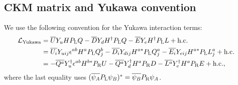 \documentclass[CheatSheet]{subfiles}
\begin{document}
\subsection{CKM matrix and Yukawa convention}\label{sec:SM-CKM}
We use the following convention for  the Yukawa interaction terms:
\begin{align}
  \mathcal L\w{Yukawa}&=
  \overline{U}\Yu H \PL Q
- \overline{D}\Yd H^\dagger \PL Q
- \overline{E}\Ye H^\dagger \PL L + \text{h.c.}\label{eq:SMyukawa}
\\&=
  \overline{U_i}\Yu[ij] \epsilon^{ab}H^a \PL Q_j^b
- \overline{D_i}\Yd[ij] H^{a*} \PL Q_j^a
- \overline{E_i}\Ye[ij] H^{a*} \PL L_j^a + \text{h.c.}
\\&=
- \overline{Q^a}\Yu^\dagger \epsilon^{ab}H^{b*} \PR U
- \overline{Q^a}\Yd^\dagger H^{a} \PR D
- \overline{L^a}\Ye^\dagger H^{a} \PR E + \text{h.c.},
\end{align}
where the last equality uses $(\overline{\psi_A}\PL\psi_B)^*=\overline{\psi_B}\PR\psi_A$.
\end{document}
